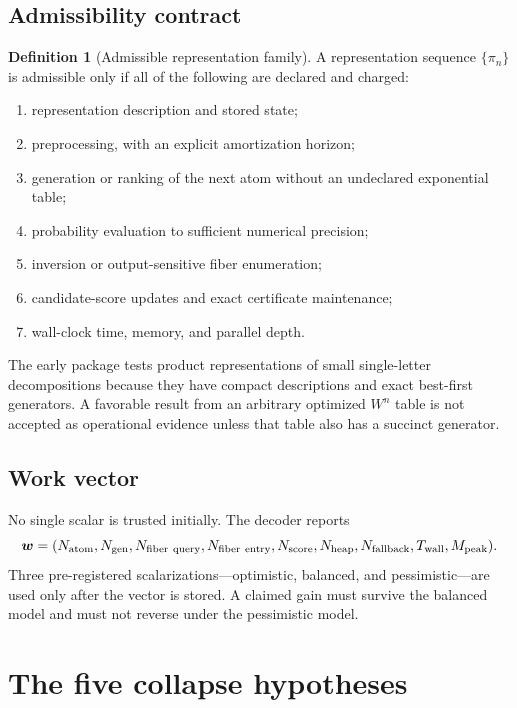 \documentclass[11pt]{article}
\theoremstyle{definition}
\newtheorem{definition}[theorem]{Definition}
\theoremstyle{remark}
\begin{document}
\subsection{Admissibility contract}

\begin{definition}[Admissible representation family]
A representation sequence $\{\pi_n\}$ is admissible only if all of the following are declared and charged:
\begin{enumerate}[label=(\alph*)]
\item representation description and stored state;
\item preprocessing, with an explicit amortization horizon;
\item generation or ranking of the next atom without an undeclared exponential table;
\item probability evaluation to sufficient numerical precision;
\item inversion or output-sensitive fiber enumeration;
\item candidate-score updates and exact certificate maintenance;
\item wall-clock time, memory, and parallel depth.
\end{enumerate}
\end{definition}

The early package tests product representations of small single-letter decompositions because they have compact descriptions and exact best-first generators. A favorable result from an arbitrary optimized $W^n$ table is not accepted as operational evidence unless that table also has a succinct generator.

\subsection{Work vector}

No single scalar is trusted initially. The decoder reports
\begin{equation}
\bm w=(N_{\rm atom},N_{\rm gen},N_{\rm fiber\ query},N_{\rm fiber\ entry},
N_{\rm score},N_{\rm heap},N_{\rm fallback},T_{\rm wall},M_{\rm peak}).
\label{eq:workvector}
\end{equation}
Three pre-registered scalarizations---optimistic, balanced, and pessimistic---are used only after the vector is stored. A claimed gain must survive the balanced model and must not reverse under the pessimistic model.

\section{The five collapse hypotheses}
\end{document}
